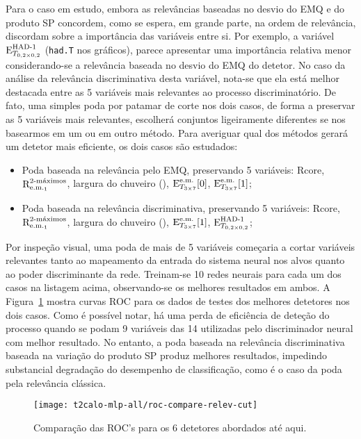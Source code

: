 Para o caso em estudo, embora as relevâncias baseadas no desvio do EMQ e do
produto SP concordem, como se espera, em grande parte, na ordem de
relevância, discordam sobre a importância das variáveis entre si. Por exemplo,
a variável $\ethad$ (\texttt{had.T} nos gráficos), parece apresentar uma
importância relativa menor considerando-se a relevância baseada no desvio do
EMQ do detetor. No caso da análise da relevância discriminativa desta
variável, nota-se que ela está melhor destacada entre as 5 variáveis mais
relevantes ao processo discriminatório. De fato, uma simples poda por patamar
de corte nos dois casos, de forma a preservar as 5 variáveis mais relevantes,
escolherá conjuntos ligeiramente diferentes se nos basearmos em um ou em outro
método. Para averiguar qual dos métodos gerará um detetor mais eficiente, os
dois casos são estudados:

\begin{itemize}
\item Poda baseada na relevância pelo EMQ, preservando 5 variáveis: Rcore,
$\eratio$, largura do chuveiro (), $\etem[0]$, $\etem[1]$; 
\item Poda baseada na relevância discriminativa, preservando 5 variáveis:
Rcore, $\eratio$, largura do chuveiro (), $\etem[1]$, $\ethad$;
\end{itemize}

Por inspeção visual, uma poda de mais de 5 variáveis começaria a cortar
variáveis relevantes tanto ao mapeamento da entrada do sistema neural nos
alvos quanto ao poder discriminante da rede. Treinam-se 10 redes neurais para
cada um dos casos na listagem acima, observando-se os melhores resultados em
ambos. A Figura~\ref{fig:t2calo-all-relev-cut-compare} mostra curvas ROC para
os dados de testes dos melhores detetores nos dois casos. Como é possível
notar, há uma perda de eficiência de deteção do processo quando se podam 9
variáveis das 14 utilizadas pelo discriminador neural com melhor resultado. No
entanto, a poda baseada na relevância discriminativa baseada na variação do
produto SP produz melhores resultados, impedindo substancial degradação do
desempenho de classificação, como é o caso da poda pela relevância clássica.

\begin{figure}
\begin{center}
\texttt{[image: t2calo-mlp-all/roc-compare-relev-cut]}
\end{center}
\caption{Comparação das ROC's para os 6 detetores abordados até aqui.}
\label{fig:t2calo-all-relev-cut-compare}
\end{figure}

